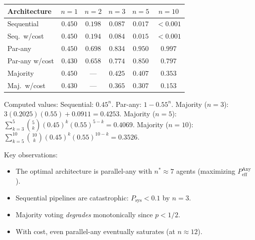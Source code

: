 \begin{example}[Complete Performance Table at $p = 0.45$, $c = 0.02$]
\label{ex:complete-table}
\begin{center}
\begin{tabular}{l|ccccc}
Architecture & $n=1$ & $n=2$ & $n=3$ & $n=5$ & $n=10$ \\
\hline
Sequential & $0.450$ & $0.198$ & $0.087$ & $0.017$ & $<0.001$ \\
Seq.\ w/cost & $0.450$ & $0.194$ & $0.084$ & $0.015$ & $<0.001$ \\
Par-any & $0.450$ & $0.698$ & $0.834$ & $0.950$ & $0.997$ \\
Par-any w/cost & $0.430$ & $0.658$ & $0.774$ & $0.850$ & $0.797$ \\
Majority & $0.450$ & --- & $0.425$ & $0.407$ & $0.353$ \\
Maj.\ w/cost & $0.430$ & --- & $0.365$ & $0.307$ & $0.153$ \\
\end{tabular}
\end{center}
Computed values: Sequential: $0.45^n$. Par-any: $1-0.55^n$. Majority ($n=3$):
$3(0.2025)(0.55) + 0.0911 = 0.4253$. Majority ($n=5$):
$\sum_{k=3}^{5}\binom{5}{k}(0.45)^k(0.55)^{5-k} = 0.4069$.
Majority ($n=10$): $\sum_{k=5}^{10}\binom{10}{k}(0.45)^k(0.55)^{10-k} = 0.3526$.

\medskip\noindent
Key observations:
\begin{itemize}
  \item The optimal architecture is parallel-any with $n^* \approx 7$ agents
    (maximizing $P_{\mathrm{eff}}^{\mathrm{Any}}$).
  \item Sequential pipelines are catastrophic: $P_{\mathrm{sys}} < 0.1$ by $n = 3$.
  \item Majority voting \emph{degrades} monotonically since $p < 1/2$.
  \item With cost, even parallel-any eventually saturates (at $n \approx 12$).
\end{itemize}
\end{example}

